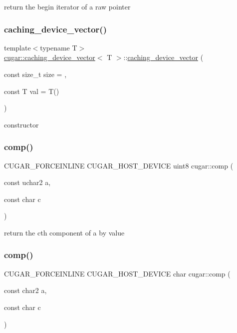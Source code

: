 return the begin iterator of a raw pointer \mbox{\label{group___basic_ga2146480a7d6cae513ac29c3ec28a73a3}} 
\subsubsection{\texorpdfstring{caching\+\_\+device\+\_\+vector()}{caching\_device\_vector()}}
{\footnotesize\ttfamily template$<$typename T$>$ \\
\hyperlink{structcugar_1_1caching__device__vector}{cugar\+::caching\+\_\+device\+\_\+vector}$<$ T $>$\+::\hyperlink{structcugar_1_1caching__device__vector}{caching\+\_\+device\+\_\+vector} (\begin{DoxyParamCaption}\item[{const size\+\_\+t}]{size = {},  }\item[{const T}]{val = {\ttfamily T()} }\end{DoxyParamCaption})\hspace{0.3cm}{\ttfamily [inline]}}

constructor \mbox{\label{group___basic_gae73662ac7ace330f8b3f726381785f28}} 
\subsubsection{\texorpdfstring{comp()}{comp()}\hspace{0.1cm}{\footnotesize\ttfamily [1/11]}}
{\footnotesize\ttfamily C\+U\+G\+A\+R\+\_\+\+F\+O\+R\+C\+E\+I\+N\+L\+I\+NE C\+U\+G\+A\+R\+\_\+\+H\+O\+S\+T\+\_\+\+D\+E\+V\+I\+CE uint8 cugar\+::comp (\begin{DoxyParamCaption}\item[{const uchar2}]{a,  }\item[{const char}]{c }\end{DoxyParamCaption})}

return the c\textquotesingle{}th component of a by value \mbox{\label{group___basic_ga8496934a659f5521de74af54b0805e37}} 
\subsubsection{\texorpdfstring{comp()}{comp()}\hspace{0.1cm}{\footnotesize\ttfamily [2/11]}}
{\footnotesize\ttfamily C\+U\+G\+A\+R\+\_\+\+F\+O\+R\+C\+E\+I\+N\+L\+I\+NE C\+U\+G\+A\+R\+\_\+\+H\+O\+S\+T\+\_\+\+D\+E\+V\+I\+CE char cugar\+::comp (\begin{DoxyParamCaption}\item[{const char2}]{a,  }\item[{const char}]{c }\end{DoxyParamCaption})}

